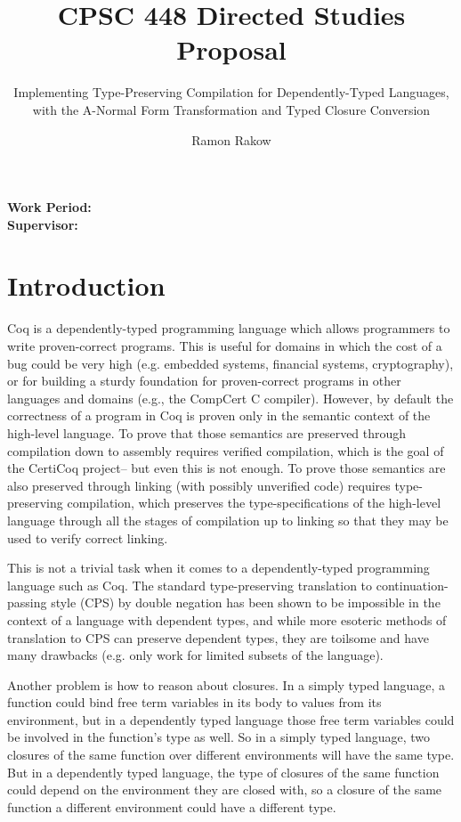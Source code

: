 \documentclass[manuscript]{acmart}
\begin{document}
\title{CPSC 448 Directed Studies Proposal}
\subtitle{Implementing Type-Preserving Compilation for Dependently-Typed Languages, with the A-Normal Form Transformation and Typed Closure Conversion}
\author{Ramon Rakow}
\maketitle

\textbf{Work Period:}
\\
\textbf{Supervisor:}

\section{Introduction}

Coq is a dependently-typed programming language which allows programmers to write proven-correct programs. This is useful for domains in which the cost of a bug could be very high (e.g. embedded systems, financial systems, cryptography), or for building a sturdy foundation for proven-correct programs in other languages and domains (e.g., the CompCert C compiler). However, by default the correctness of a program in Coq is proven only in the semantic context of the high-level language. To prove that those semantics are preserved through compilation down to assembly requires verified compilation, which is the goal of the CertiCoq project-- but even this is not enough. To prove those semantics are also preserved through linking (with possibly unverified code) requires type-preserving compilation, which preserves the type-specifications of the high-level language through all the stages of compilation up to linking so that they may be used to verify correct linking. 

This is not a trivial task when it comes to a dependently-typed programming language such as Coq. The standard type-preserving translation to continuation-passing style (CPS) by double negation has been shown to be impossible in the context of a language with dependent types, and while more esoteric methods of translation to CPS can preserve dependent types, they are toilsome and have many drawbacks (e.g. only work for limited subsets of the language). 

Another problem is how to reason about closures. In a simply typed language, a function could bind free term variables in its body to values from its environment, but in a dependently typed language those free term variables could be involved in the function's type as well. So in a simply typed language, two closures of the same function over different environments will have the same type. But in a dependently typed language, the type of closures of the same function could depend on the environment they are closed with, so a closure of the same function a different environment could have a different type.
\end{document}
